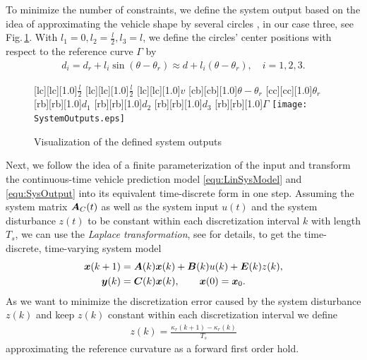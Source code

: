 To minimize the number of constraints, we define the system output based on the idea of approximating the vehicle shape by several circles  \cite{zieglerfastcollision2010}, in our case three, see Fig.\,\ref{fig:SystemOutputs}. With $l_1 = 0, l_2 = \tfrac{l}{2}, l_3 = l$, we define the circles' center positions with respect to the reference curve $\Gamma$ by
\begin{align}
	d_i = d_r + l_i \sin(\theta - \theta_r) \approx d + l_i(\theta - \theta_r), \quad i = 1, 2, 3.
	\label{equ:CCSystemOut}
\end{align}

\begin{figure}[h]
	[lc][lc][1.0]{$\tfrac{l}{2}$}
	[lc][lc][1.0]{$\tfrac{l}{2}$}
	[lc][lc][1.0]{$v$}
	[cb][cb][1.0]{$\theta-\theta_r$}
	[cc][cc][1.0]{$\theta_r$}
	[rb][rb][1.0]{$d_1$}
	[rb][rb][1.0]{$d_2$}
	[rb][rb][1.0]{$d_3$}
	[rb][rb][1.0]{$\Gamma$}
    \centering
    \texttt{[image: SystemOutputs.eps]}
    \caption{Visualization of the defined system outputs}
    \label{fig:SystemOutputs}
\end{figure}

Next, we follow the idea of a finite parameterization of the input and transform the continuous-time vehicle prediction model \eqref{equ:LinSysModel} and \eqref{equ:SysOutput} into its equivalent time-discrete form in one step. Assuming the system matrix $\boldsymbol{A}_C(t)$ as well as the system input $u(t)$ and the system disturbance $z(t)$ to be constant within each discretization interval $k$ with length $T_s$, we can use the \textit{Laplace transformation}, see \cite{gutjahr2016lateral} for details, to get the time-discrete, time-varying system model
\begin{align}
	\begin{aligned}
		\vektor x(k+1) &= \mat A(k) \vektor x(k) + \mat B(k) u(k) + \mat E(k) z(k), \\
						\vektor y(k) &= \mat C(k) \vektor x(k),\quad \quad \bs x(0) = \bs x_0. 
	\end{aligned}
	\label{equ:DisPreMod}
\end{align}
As we want to minimize the discretization error caused by the system disturbance $z(k)$ and keep $z(k)$ constant within each discretization interval we define
\begin{align}
	z(k) = \frac{\kappa_r(k+1) - \kappa_r(k)}{T_s}
	\label{equ:FFOHkappaR}
\end{align}
approximating the reference curvature as a forward first order hold.

